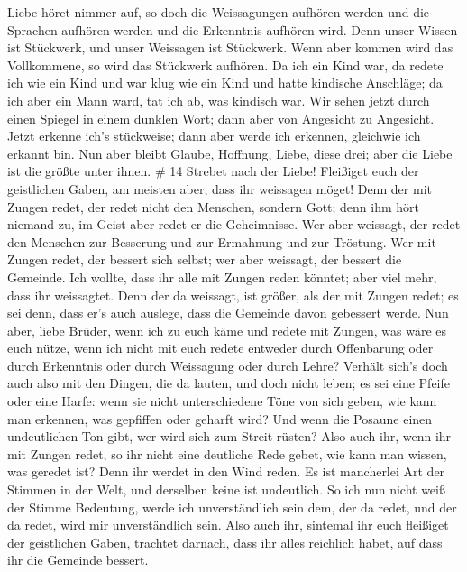 Liebe höret nimmer auf, so doch die Weissagungen aufhören werden und die
Sprachen aufhören werden und die Erkenntnis aufhören wird. 
Denn unser Wissen ist Stückwerk, und unser Weissagen ist Stückwerk.
 Wenn aber kommen wird das Vollkommene, so wird das
Stückwerk aufhören.  Da ich ein Kind war, da redete ich wie
ein Kind und war klug wie ein Kind und hatte kindische Anschläge; da ich
aber ein Mann ward, tat ich ab, was kindisch war.  Wir
sehen jetzt durch einen Spiegel in einem dunklen Wort; dann aber von
Angesicht zu Angesicht. Jetzt erkenne ich's stückweise; dann aber werde
ich erkennen, gleichwie ich erkannt bin.  Nun aber bleibt
Glaube, Hoffnung, Liebe, diese drei; aber die Liebe ist die größte unter
ihnen. \# 14  Strebet nach der Liebe! Fleißiget euch der
geistlichen Gaben, am meisten aber, dass ihr weissagen möget!
 Denn der mit Zungen redet, der redet nicht den Menschen,
sondern Gott; denn ihm hört niemand zu, im Geist aber redet er die
Geheimnisse.  Wer aber weissagt, der redet den Menschen zur
Besserung und zur Ermahnung und zur Tröstung.  Wer mit
Zungen redet, der bessert sich selbst; wer aber weissagt, der bessert
die Gemeinde.  Ich wollte, dass ihr alle mit Zungen reden
könntet; aber viel mehr, dass ihr weissagtet. Denn der da weissagt, ist
größer, als der mit Zungen redet; es sei denn, dass er's auch auslege,
dass die Gemeinde davon gebessert werde.  Nun aber, liebe
Brüder, wenn ich zu euch käme und redete mit Zungen, was wäre es euch
nütze, wenn ich nicht mit euch redete entweder durch Offenbarung oder
durch Erkenntnis oder durch Weissagung oder durch Lehre? 
Verhält sich's doch auch also mit den Dingen, die da lauten, und doch
nicht leben; es sei eine Pfeife oder eine Harfe: wenn sie nicht
unterschiedene Töne von sich geben, wie kann man erkennen, was gepfiffen
oder geharft wird?  Und wenn die Posaune einen undeutlichen
Ton gibt, wer wird sich zum Streit rüsten?  Also auch ihr,
wenn ihr mit Zungen redet, so ihr nicht eine deutliche Rede gebet, wie
kann man wissen, was geredet ist? Denn ihr werdet in den Wind reden.
 Es ist mancherlei Art der Stimmen in der Welt, und
derselben keine ist undeutlich.  So ich nun nicht weiß der
Stimme Bedeutung, werde ich unverständlich sein dem, der da redet, und
der da redet, wird mir unverständlich sein.  Also auch ihr,
sintemal ihr euch fleißiget der geistlichen Gaben, trachtet darnach,
dass ihr alles reichlich habet, auf dass ihr die Gemeinde bessert.

